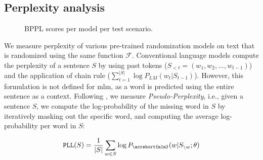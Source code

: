\documentclass[letterpaper, 12pt]{report}
\begin{document}
\subsection{Perplexity analysis}

\begin{figure}[t]
    \centering
    \caption{BPPL scores per model per test scenario.}
    \label{fig:bpplm}
\end{figure}

We measure perplexity of various pre-trained randomization models on text that is randomized using the same function $\mathcal{F}$. Conventional language models compute the perplexity of a sentence $S$ by using past tokens ($S_{<t} = (w_1, w_2, \ldots, w_{t-1})$) and the application of chain rule ($\sum_{t=1}^{|S|} \log P_{\textit{LM}}(w_t | S_{t-1})$). However, this formulation is not defined for \acrshort{mlm}, as a word is predicted using the entire sentence as a context.  Following \citet{salazar2020a}, we measure \textit{Pseudo-Perplexity}, i.e., given a sentence $S$, we compute the log-probability of the missing word in $S$ by iteratively masking out the specific word, and computing the average log-probability per word in $S$:

\begin{equation}
    \texttt{PLL}(S) = \frac{1}{|S|} \sum_{w \in S} \log P_{\texttt{\acrshort{mlm}}} (w | S_{\setminus w}; \theta)
\end{equation}
\end{document}
